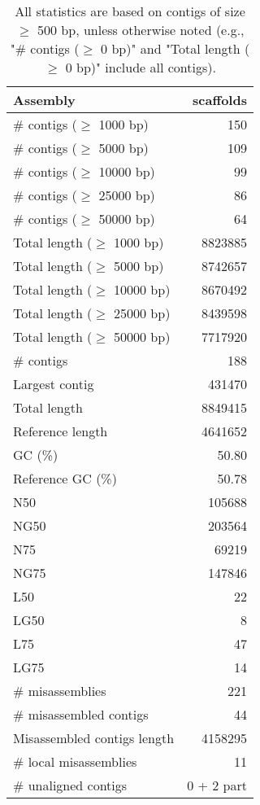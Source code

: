 \documentclass[12pt,a4paper]{article}
\begin{document}
\begin{table}[ht]
\begin{center}
\caption{All statistics are based on contigs of size $\geq$ 500 bp, unless otherwise noted (e.g., "\# contigs ($\geq$ 0 bp)" and "Total length ($\geq$ 0 bp)" include all contigs).}
\begin{tabular}{|l*{1}{|r}|}
\hline
Assembly & scaffolds \\ \hline
\# contigs ($\geq$ 1000 bp) & 150 \\ \hline
\# contigs ($\geq$ 5000 bp) & 109 \\ \hline
\# contigs ($\geq$ 10000 bp) & 99 \\ \hline
\# contigs ($\geq$ 25000 bp) & 86 \\ \hline
\# contigs ($\geq$ 50000 bp) & 64 \\ \hline
Total length ($\geq$ 1000 bp) & 8823885 \\ \hline
Total length ($\geq$ 5000 bp) & 8742657 \\ \hline
Total length ($\geq$ 10000 bp) & 8670492 \\ \hline
Total length ($\geq$ 25000 bp) & 8439598 \\ \hline
Total length ($\geq$ 50000 bp) & 7717920 \\ \hline
\# contigs & 188 \\ \hline
Largest contig & 431470 \\ \hline
Total length & 8849415 \\ \hline
Reference length & 4641652 \\ \hline
GC (\%) & 50.80 \\ \hline
Reference GC (\%) & 50.78 \\ \hline
N50 & 105688 \\ \hline
NG50 & 203564 \\ \hline
N75 & 69219 \\ \hline
NG75 & 147846 \\ \hline
L50 & 22 \\ \hline
LG50 & 8 \\ \hline
L75 & 47 \\ \hline
LG75 & 14 \\ \hline
\# misassemblies & 221 \\ \hline
\# misassembled contigs & 44 \\ \hline
Misassembled contigs length & 4158295 \\ \hline
\# local misassemblies & 11 \\ \hline
\# unaligned contigs & 0 + 2 part \\ \hline

\end{tabular}
\end{center}
\end{table}
\end{document}
